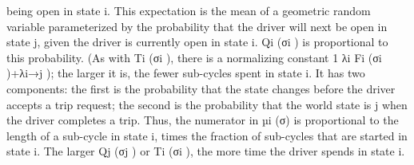 \documentclass[10pt]{article}
\begin{document}
\begin{ReviewVerbatim}
being open in state i. This expectation is the mean of a geometric random variable parameterized
by the probability that the driver will next be open in state j, given the driver is currently open in
state i. Qi (σi ) is proportional to this probability. (As with Ti (σi ), there is a normalizing constant
1
λi Fi (σi )+λi→j ); the larger it is, the fewer sub-cycles spent in state i. It has two components: the
first is the probability that the state changes before the driver accepts a trip request; the second
is the probability that the world state is j when the driver completes a trip. Thus, the numerator
in µi (σ) is proportional to the length of a sub-cycle in state i, times the fraction of sub-cycles that
are started in state i. The larger Qj (σj ) or Ti (σi ), the more time the driver spends in state i.
\end{ReviewVerbatim}
\end{document}
